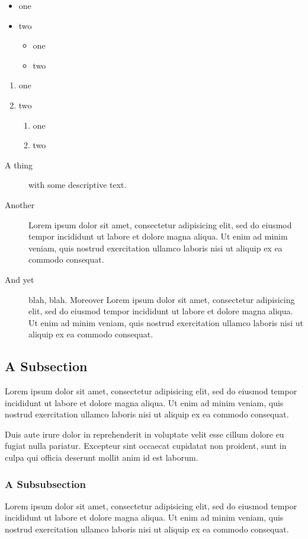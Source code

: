 \documentclass{book}
\begin{document}
\begin{itemize}
 \item one
 \item two
   \begin{itemize}
    \item one
    \item two
   \end{itemize}
\end{itemize}

\begin{enumerate}
 \item one
 \item two
   \begin{enumerate}
    \item one
    \item two
   \end{enumerate}
\end{enumerate}

\begin{description}
\item[A thing] with some descriptive text.
\item[Another] Lorem ipsum dolor sit amet, consectetur adipisicing elit, sed do eiusmod tempor incididunt ut labore et dolore magna aliqua. Ut enim ad minim veniam, quis nostrud exercitation ullamco laboris nisi ut aliquip ex ea commodo consequat. 
\item[And yet] blah, blah. Moreover
Lorem ipsum dolor sit amet, consectetur adipisicing elit, sed do eiusmod tempor incididunt ut labore et dolore magna aliqua. Ut enim ad minim veniam, quis nostrud exercitation ullamco laboris nisi ut aliquip ex ea commodo consequat. 
\end{description}

\subsection{A Subsection}
Lorem ipsum dolor sit amet, consectetur adipisicing elit, sed do eiusmod tempor incididunt ut labore et dolore magna aliqua. Ut enim ad minim veniam, quis nostrud exercitation ullamco laboris nisi ut aliquip ex ea commodo consequat.

Duis aute irure dolor in reprehenderit in voluptate velit esse cillum dolore eu fugiat nulla pariatur. Excepteur sint occaecat cupidatat non proident, sunt in culpa qui officia deserunt mollit anim id est laborum.

\subsubsection{A Subsubsection}
Lorem ipsum dolor sit amet, consectetur adipisicing elit, sed do eiusmod tempor incididunt ut labore et dolore magna aliqua. Ut enim ad minim veniam, quis nostrud exercitation ullamco laboris nisi ut aliquip ex ea commodo consequat.
\end{document}
